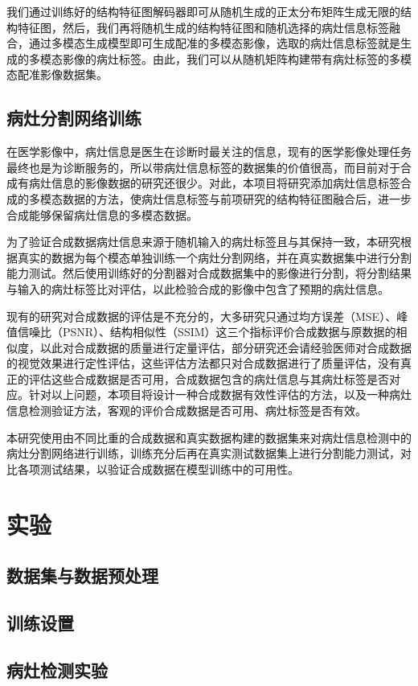 \documentclass[letterpaper]{article} %
\begin{document}
我们通过训练好的结构特征图解码器即可从随机生成的正太分布矩阵生成无限的结构特征图，然后，我们再将随机生成的结构特征图和随机选择的病灶信息标签融合，通过多模态生成模型即可生成配准的多模态影像，选取的病灶信息标签就是生成的多模态影像的病灶标签。由此，我们可以从随机矩阵构建带有病灶标签的多模态配准影像数据集。

\subsection{病灶分割网络训练}
在医学影像中，病灶信息是医生在诊断时最关注的信息，现有的医学影像处理任务最终也是为诊断服务的，所以带病灶信息标签的数据集的价值很高，而目前对于合成有病灶信息的影像数据的研究还很少。对此，本项目将研究添加病灶信息标签合成的多模态数据的方法，使病灶信息标签与前项研究的结构特征图融合后，进一步合成能够保留病灶信息的多模态数据。

为了验证合成数据病灶信息来源于随机输入的病灶标签且与其保持一致，本研究根据真实的数据为每个模态单独训练一个病灶分割网络，并在真实数据集中进行分割能力测试。然后使用训练好的分割器对合成数据集中的影像进行分割，将分割结果与输入的病灶标签比对评估，以此检验合成的影像中包含了预期的病灶信息。

现有的研究对合成数据的评估是不充分的，大多研究只通过均方误差（MSE）、峰值信噪比（PSNR）、结构相似性（SSIM）这三个指标评价合成数据与原数据的相似度，以此对合成数据的质量进行定量评估，部分研究还会请经验医师对合成数据的视觉效果进行定性评估，这些评估方法都只对合成数据进行了质量评估，没有真正的评估这些合成数据是否可用，合成数据包含的病灶信息与其病灶标签是否对应。针对以上问题，本项目将设计一种合成数据有效性评估的方法，以及一种病灶信息检测验证方法，客观的评价合成数据是否可用、病灶标签是否有效。

本研究使用由不同比重的合成数据和真实数据构建的数据集来对病灶信息检测中的病灶分割网络进行训练，训练充分后再在真实测试数据集上进行分割能力测试，对比各项测试结果，以验证合成数据在模型训练中的可用性。

\section{实验}
\subsection{数据集与数据预处理}
\subsection{训练设置}
\subsection{病灶检测实验}
\end{document}
